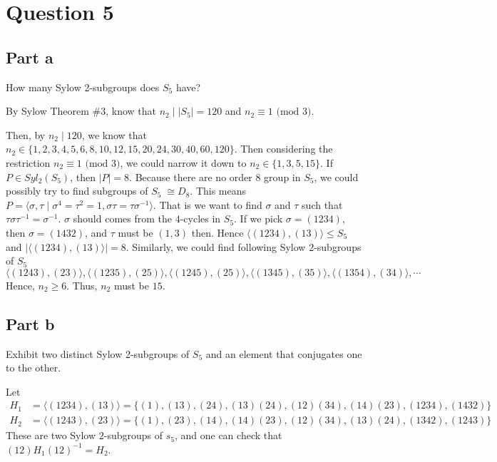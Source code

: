 \section{Question 5}

\subsection{Part a}

\begin{question}
    How many Sylow 2-subgroups does $S_5$ have?
\end{question}

\begin{answer}
    By Sylow Theorem \#3, know that $n_2 \mid \lvert S_5 \rvert = 120$ and $n_2 \equiv 1 \text{ (mod $3$)}$.
    
    Then, by $n_2 \mid 120$, we know that $n_2 \in \{1, 2, 3, 4, 5, 6, 8, 10, 12, 15, 20, 24, 30, 40, 60, 120\}$. Then considering the restriction $n_2 \equiv 1 \text{ (mod $3$)}$, we could narrow it down to $n_2 \in \{1, 3, 5, 15\}$. If $P \in Syl_2(S_5)$, then $\lvert P \rvert = 8$. Because there are no order $8$ group in $S_5$, we could possibly try to find subgroups of $S_5 \; \cong D_8$. This means $P = \langle \sigma,\tau \mid \sigma^4 = \tau^2 = 1, \sigma\tau = \tau \sigma^{-1} \rangle$. That is we want to find $\sigma$ and $\tau$ such that $\tau \sigma \tau^{-1} = \sigma^{-1}$. $\sigma$ should comes from the $4$-cycles in $S_5$. If we pick $\sigma = (1234)$, then $\sigma = (1432)$, and $\tau$ must be $(1,3)$ then. Hence $\langle (1234),(13) \rangle \leqslant S_5$ and $\lvert \langle (1234),(13)\rangle \rvert = 8$. Similarly, we could find following Sylow 2-subgroups of $S_5$
    \begin{equation}
        \langle (1243),(23) \rangle, \langle (1235),(25) \rangle, \langle (1245),(25) \rangle, \langle (1345),(35) \rangle, \langle (1354),(34) \rangle, \cdots
    \end{equation}
    Hence, $n_2 \geq 6$. Thus, $n_2$ must be $15$.
\end{answer}

\subsection{Part b}

\begin{question}
    Exhibit two distinct Sylow 2-subgroups of $S_5$ and an element that conjugates one to the other.
\end{question}

\begin{answer}
    Let 
    \begin{equation}
        \begin{aligned}
            H_1 &= \langle (1234),(13) \rangle = \{(1),(13),(24),(13)(24),(12)(34),(14)(23),(1234),(1432)\}\\
            H_2 &= \langle (1243),(23) \rangle = \{(1),(23),(14),(14)(23),(12)(34),(13)(24),(1342),(1243)\}
        \end{aligned}
    \end{equation}
    These are two Sylow $2$-subgroups of $s_5$, and one can check that $(12)H_1(12)^{-1} = H_2$.
\end{answer}